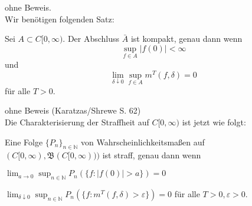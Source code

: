 \documentclass[a4paper,twoside,DIV15,BCOR12mm]{scrbook}
\newcommand{\borel}{{\mathfrak B}}
\begin{document}
ohne Beweis. \\
Wir benötigen folgenden Satz:
\begin{satz}
  \label{satz:14.5}
Sei $A\subset C[0,\infty)$. Der Abschluss $\bar A$ ist kompakt, genau dann wenn
\[
\sup_{f\in A}\vert f(0)\vert < \infty
\]
und
\[
\lim_{\delta\downarrow 0} \sup_{f\in A} m^T(f,\delta)=0
\]
für alle $T>0$.
\end{satz}
ohne Beweis (Karatzas/Shrewe S. 62) \\
Die Charakterisierung der Straffheit auf $C[0,\infty)$ ist jetzt wie folgt:
  \begin{satz}
    \label{satz:14.6}
Eine Folge $\{P_n\}_{n\in\mathbb N}$ von Wahrscheinlichkeitsmaßen auf $(C[0,\infty),\borel(C[0,\infty)))$ ist straff, genau dann wenn
      \begin{enuma}
      \item $ \lim_{a\to0}\sup_{n\in\mathbb N}P_n(\{f:\vert f(0)\vert > a\})=0 $
      \item $ \lim_{\delta\downarrow0}\sup_{n\in\mathbb N}P_n(\{f:m^T(f,\delta)>\varepsilon\})=0$ für alle $T>0,\varepsilon>0$.
      \end{enuma}
  \end{satz}
\end{document}
